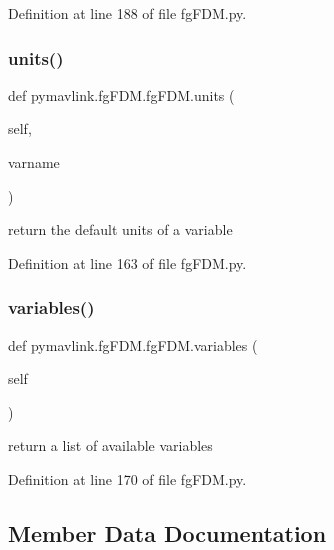 Definition at line 188 of file fg\+F\+D\+M.\+py.

\mbox{\label{classpymavlink_1_1fgFDM_1_1fgFDM_a57c41f1b87ecb4bff8d40e63cf7ba6d5}} 
\subsubsection{\texorpdfstring{units()}{units()}}
{\footnotesize\ttfamily def pymavlink.\+fg\+F\+D\+M.\+fg\+F\+D\+M.\+units (\begin{DoxyParamCaption}\item[{}]{self,  }\item[{}]{varname }\end{DoxyParamCaption})}

\begin{DoxyVerb}return the default units of a variable\end{DoxyVerb}
 

Definition at line 163 of file fg\+F\+D\+M.\+py.

\mbox{\label{classpymavlink_1_1fgFDM_1_1fgFDM_ae0756cde090c7a8a0cf9c08a6cbd700e}} 
\subsubsection{\texorpdfstring{variables()}{variables()}}
{\footnotesize\ttfamily def pymavlink.\+fg\+F\+D\+M.\+fg\+F\+D\+M.\+variables (\begin{DoxyParamCaption}\item[{}]{self }\end{DoxyParamCaption})}

\begin{DoxyVerb}return a list of available variables\end{DoxyVerb}
 

Definition at line 170 of file fg\+F\+D\+M.\+py.



\subsection{Member Data Documentation}
\mbox{\label{classpymavlink_1_1fgFDM_1_1fgFDM_ad756860723bcc8899b72df6596798e49}} 
